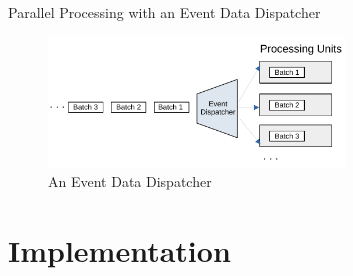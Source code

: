 \documentclass[9pt]{beamer}
\begin{document}

\begin{frame}[fragile]{Parallel Processing with an Event Data Dispatcher  }

    \begin{figure}
        \begin{center}
            \includegraphics[width=0.7\textwidth]{../paper/images/Stream-Batch-Distributions}
            \caption{An Event Data Dispatcher}
            \label{fig:batch-distributions}
        \end{center}
    \end{figure}

\end{frame}






\section{Implementation}



\end{document}
